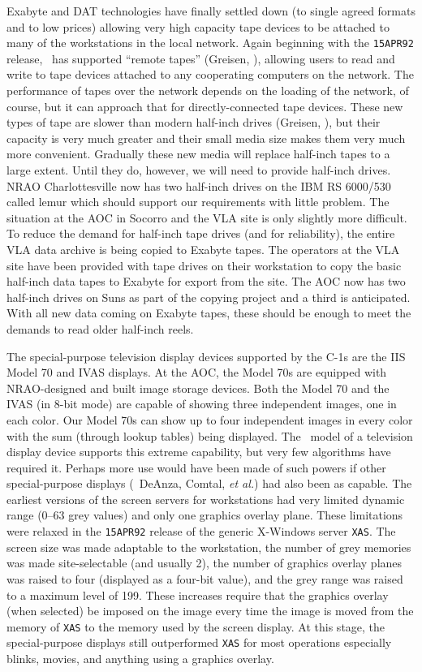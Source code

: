      Exabyte and DAT technologies have finally settled down (to single
agreed formats and to low prices) allowing very high capacity tape
devices to be attached to many of the workstations in the local
network.  Again beginning with the {\tt 15APR92} release, \AIPS\ has
supported ``remote tapes'' (Greisen, \cite{kn:gre1}), allowing users
to read and write to tape devices attached to any cooperating
computers on the network.  The performance of tapes over the network
depends on the loading of the network, of course, but it can approach
that for directly-connected tape devices.  These new types of tape are
slower than modern half-inch drives (Greisen, \cite{kn:gre2}), but
their capacity is very much greater and their small media size makes
them very much more convenient.  Gradually these new media will
replace half-inch tapes to a large extent.  Until they do, however, we
will need to provide half-inch drives.  NRAO Charlottesville now has
two half-inch drives on the IBM RS 6000/530 called lemur which should
support our requirements with little problem.  The situation at the
AOC in Socorro and the VLA site is only slightly more difficult.  To
reduce the demand for half-inch tape drives (and for reliability), the
entire VLA data archive is being copied to Exabyte tapes.  The
operators at the VLA site have been provided with tape drives on their
workstation to copy the basic half-inch data tapes to Exabyte for
export from the site.  The AOC now has two half-inch drives on Suns as
part of the copying project and a third is anticipated.   With all new
data coming on Exabyte tapes, these should be enough to meet the
demands to read older half-inch reels.

     The special-purpose television display devices supported by the
C-1s are the IIS Model 70 and IVAS displays.  At the AOC, the Model
70s are equipped with NRAO-designed and built image storage devices.
Both the Model 70 and the IVAS (in 8-bit mode) are capable of showing
three independent images, one in each color.  Our Model 70s can show
up to four independent images in every color with the sum (through
lookup tables) being displayed.  The \AIPS\ model of a television
display device supports this extreme capability, but very few
algorithms have required it.  Perhaps more use would have been made of
such powers if other special-purpose displays (\eg\ DeAnza, Comtal,
{\em et al.}) had also been as capable.  The earliest versions of the
screen servers for workstations had very limited dynamic range (0--63
grey values) and only one graphics overlay plane.  These limitations
were relaxed in the {\tt 15APR92} release of the generic X-Windows
server \hbox{{\tt XAS}}.  The screen size was made adaptable to the
workstation, the number of grey memories was made site-selectable (and
usually 2), the number of graphics overlay planes was raised to four
(displayed as a four-bit value), and the grey range was raised to a
maximum level of 199.  These increases require that the graphics
overlay (when selected) be imposed on the image every time the image
is moved from the memory of {\tt XAS} to the memory used by the screen
display.  At this stage, the special-purpose displays still
outperformed {\tt XAS} for most operations especially blinks, movies,
and anything using a graphics overlay.

